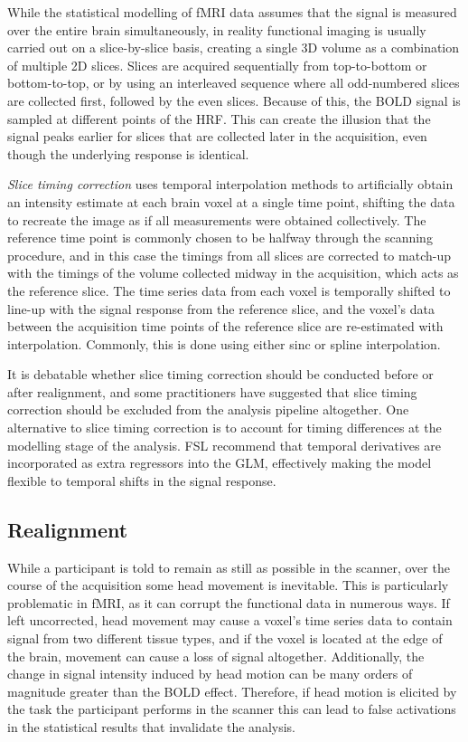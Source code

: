 While the statistical modelling of fMRI data assumes that the signal is measured over the entire brain simultaneously, in reality functional imaging is usually carried out on a slice-by-slice basis, creating a single 3D volume as a combination of multiple 2D slices. Slices are acquired sequentially from top-to-bottom or bottom-to-top, or by using an interleaved sequence where all odd-numbered slices are collected first, followed by the even slices. Because of this, the BOLD signal is sampled at different points of the HRF. This can create the illusion that the signal peaks earlier for slices that are collected later in the acquisition, even though the underlying response is identical. 

\textit{Slice timing correction} uses temporal interpolation methods to artificially obtain an intensity estimate at each brain voxel at a single time point, shifting the data to recreate the image as if all measurements were obtained collectively. The reference time point is commonly chosen to be halfway through the scanning procedure, and in this case the timings from all slices are corrected to match-up with the timings of the volume collected midway in the acquisition, which acts as the reference slice. The time series data from each voxel is temporally shifted to line-up with the signal response from the reference slice, and the voxel's data between the acquisition time points of the reference slice are re-estimated with interpolation. Commonly, this is done using either sinc or spline interpolation. 

It is debatable whether slice timing correction should be conducted before or after realignment, and some practitioners have suggested that slice timing correction should be excluded from the analysis pipeline altogether. One alternative to slice timing correction is to account for timing differences at the modelling stage of the analysis. FSL recommend that temporal derivatives are incorporated as extra regressors into the GLM, effectively making the model flexible to temporal shifts in the signal response. 

\subsection{Realignment}

While a participant is told to remain as still as possible in the scanner, over the course of the acquisition some head movement is inevitable. This is particularly problematic in fMRI, as it can corrupt the functional data in numerous ways. If left uncorrected, head movement may cause a voxel's time series data to contain signal from two different tissue types, and if the voxel is located at the edge of the brain, movement can cause a loss of signal altogether. Additionally, the change in signal intensity induced by head motion can be many orders of magnitude greater than the BOLD effect. Therefore, if head motion is elicited by the task the participant performs in the scanner this can lead to false activations in the statistical results that invalidate the analysis. 

